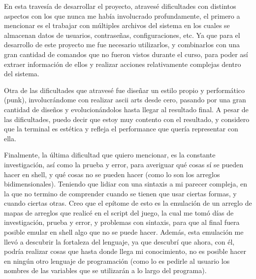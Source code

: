 \documentclass[letter,12pt]{article} %
\begin{document}
En esta travesía de desarrollar el proyecto, atravesé dificultades con distintos aspectos con los que nunca me había involucrado profundamente, el primero a mencionar es el trabajar con múltiples archivos del sistema en los cuales se almacenan datos de usuarios, contraseñas, configuraciones, etc. Ya que para el desarrollo de este proyecto me fue necesario utilizarlos, y combinarlos con una gran cantidad de comandos que no fueron vistos durante el curso, para poder así extraer información de ellos y realizar acciones relativamente complejas dentro del sistema.
\vspace{\baselineskip}

Otra de las dificultades que atravesé fue diseñar un estilo propio y performático (punk), involucrándome con realizar ascii arts desde cero, pasando por una gran cantidad de diseños y evolucionándolos hasta llegar al resultado final. A pesar de las dificultades, puedo decir que estoy muy contento con el resultado, y considero que la terminal es estética y refleja el performance que quería representar con ella.
\vspace{\baselineskip}

Finalmente, la última dificultad que quiero mencionar, es la constante investigación, así como la prueba y error, para averiguar qué cosas sí se pueden hacer en shell, y qué cosas no se pueden hacer (como lo son los arreglos bidimensionales). Teniendo que lidiar con una sintaxis a mi parecer compleja, en la que no termino de comprender cuando se tienen que usar ciertas formas, y cuando ciertas otras. Creo que el epítome de esto es la emulación de un arreglo de mapas de arreglos que realicé en el script del juego, la cual me tomó días de investigación, prueba y error, y problemas con sintaxis, para que al final fuera posible emular en shell algo que no se puede hacer. Además, esta emulación me llevó a descubrir la fortaleza del lenguaje, ya que descubrí que ahora, con él, podría realizar cosas que hasta donde llega mi conocimiento, no es posible hacer en ningún otro lenguaje de programación (como lo es pedirle al usuario los nombres de las variables que se utilizarán a lo largo del programa).\\ 
\end{document}
